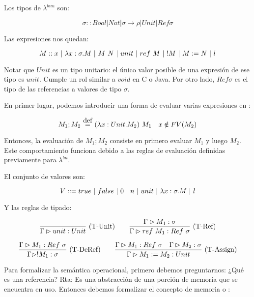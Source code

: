Los tipos de $\lambda^{bnu}$ son:

\[\sigma :: Bool \vert Nat \vert \sigma\to\rho \vert Unit \vert Ref \sigma \]

Las expresiones nos quedan:

\[M :: x \ |\  \lambda x:\sigma.M \ |\  M\ N \ |\  unit \ |\  ref\ M \ |\  !M \ |\  M := N \ |\  l \]

Notar que $Unit$ es un tipo unitario: el único valor posible de una expresión de ese tipo es $unit$. Cumple un rol similar a $void$ en C o Java. Por otro lado, $Ref \sigma$ es el tipo de las referencias a valores de tipo $\sigma$.

En primer lugar, podemos introducir una forma de evaluar varias expresiones en :

\[M_1; M_2 \eqdef \app{(\abs{x}{Unit}{M_2})}{M_1}\quad x\notin FV(M_2)\]

Entonces, la evaluación de $M_1; M_2$ consiste en primero evaluar $M_1$  y luego $M_2$. Este comportamiento funciona debido a las reglas de evaluación definidas previamente para $\lambda^{bn}$.

El conjunto de valores son:

\[V ::= true \ |\  false \ |\  0 \ |\  n \ |\  unit \ |\  \lambda x:\sigma.M \ |\  l \]

Y las reglas de tipado:

\[\deriv{}{\Gamma \rhd unit : Unit}{T-Unit}\quad\quad \deriv{\Gtipa{M_1}{\sigma}}{\Gtipa{ref\ M_1}{Ref\ \sigma}}{T-Ref}\]

\[\deriv{\Gtipa{M_1}{Ref\ \sigma}}{\Gtipa{!M_1}{\sigma}}{T-DeRef}\quad\quad \deriv{\Gtipa{M_1}{Ref\ \sigma}\quad \Gtipa{M_2}{\sigma}}{\Gtipa{M_1 := M_2}{Unit}}{T-Assign}\]

Para formalizar la semántica operacional, primero debemos preguntarnos: ¿Qué es una referencia? Rta: Es una abstracción de una porción de memoria que se encuentra en uso. Entonces debemos formalizar el concepto de memoria o :

